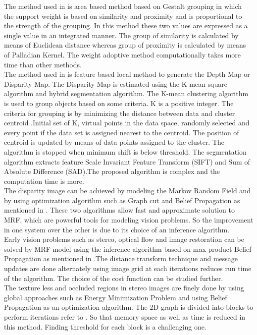 \documentclass{singlecol-new}
\theoremstyle{TH}{
\newtheorem{lemma}{Lemma}
\newtheorem{theorem}[lemma]{Theorem}
\newtheorem{corrolary}[lemma]{Corrolary}
\newtheorem{conjecture}[lemma]{Conjecture}
\newtheorem{proposition}[lemma]{Proposition}
\newtheorem{claim}[lemma]{Claim}
\newtheorem{stheorem}[lemma]{Wrong Theorem}
\newtheorem{algorithm}{Algorithm}
}
\theoremstyle{THrm}{
\newtheorem{definition}{Definition}[section]
\newtheorem{question}{Question}[section]
\newtheorem{remark}{Remark}
\newtheorem{scheme}{Scheme}
}
\theoremstyle{THhit}{
\newtheorem{case}{Case}[section]
}
\begin{document}
The method used in \cite{KUKJINSOK} is
  area based method  based on Gestalt grouping in which the support weight is based on similarity and proximity and is proportional to the strength of the grouping. In this method these two values are expressed as a single value in an integrated manner. The group of similarity is calculated by means of Euclidean distance whereas group of proximity is calculated by means of Palladian Kernel. The weight adoptive method computationally takes more time than other methods.\\
The method used in \cite{patrikkam} is  feature based local method to generate the Depth Map or Disparity Map. The Disparity Map is estimated using the K-mean square algorithm and hybrid segmentation algorithm. The K-mean clustering algorithm is used to group  objects based on some criteria. K is a positive integer. The criteria for grouping is by minimizing the distance between data and cluster centroid .Initial set of K, virtual points in the data space, randomly selected and every point if the data set is assigned nearest to the centroid. The position of centroid is updated by means of data points assigned to the cluster. The algorithm is stopped when minimum shift is below threshold. The segmentation algorithm extracts feature  Scale Invariant Feature Transform (SIFT) and Sum of Absolute Difference (SAD).The proposed algorithm is complex and the computation time is more.\\
The disparity image  can be achieved by modeling the Markov Random Field and by using optimization algorithm such as Graph cut and Belief Propagation as mentioned in \cite{TAPPEN}. These two algorithms allow fast and approximate solution to MRF, which are powerful tools for modeling vision problems. So the improvement in one system over the other is due to its choice of an inference algorithm.\\
Early vision problems such as stereo, optical flow and image restoration    can be solved by MRF model using the inference algorithm based on max product Belief Propagation as mentioned in \cite{Pedro}.The distance transform technique and message updates are done alternately using image grid at each iterations reduces run time of the algorithm. The choice of the cost function can be studied further.\\
The texture less and occluded regions in stereo images are finely done by using global approaches such as Energy Minimization Problem and using Belief Propagation as an optimization algorithm. The 2D graph is divided into blocks to perform iterations refer to \cite{chan}.          So that memory space as well as time is reduced in this method. Finding threshold for each block is a challenging one.\\
\end{document}

